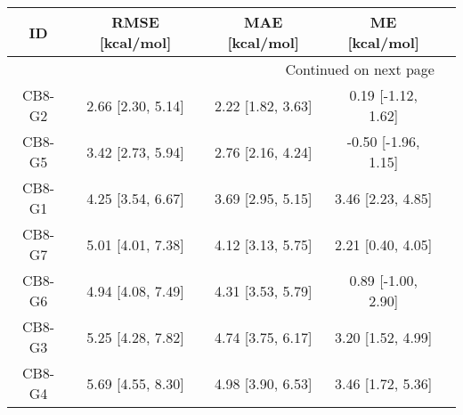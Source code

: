 \documentclass[8pt]{article}
\begin{document}
\begin{center}
\begin{footnotesize}
\begin{longtable}{|ccccc|}
\toprule
     ID &    RMSE [kcal/mol] &     MAE [kcal/mol] &        ME [kcal/mol] \\
\midrule
\endhead
\midrule
\multicolumn{4}{r}{{Continued on next page}} \\
\midrule
\endfoot

\bottomrule
\endlastfoot
 CB8-G2 &  2.66 [2.30, 5.14] &  2.22 [1.82, 3.63] &   0.19 [-1.12, 1.62] \\
 CB8-G5 &  3.42 [2.73, 5.94] &  2.76 [2.16, 4.24] &  -0.50 [-1.96, 1.15] \\
 CB8-G1 &  4.25 [3.54, 6.67] &  3.69 [2.95, 5.15] &    3.46 [2.23, 4.85] \\
 CB8-G7 &  5.01 [4.01, 7.38] &  4.12 [3.13, 5.75] &    2.21 [0.40, 4.05] \\
 CB8-G6 &  4.94 [4.08, 7.49] &  4.31 [3.53, 5.79] &   0.89 [-1.00, 2.90] \\
 CB8-G3 &  5.25 [4.28, 7.82] &  4.74 [3.75, 6.17] &    3.20 [1.52, 4.99] \\
 CB8-G4 &  5.69 [4.55, 8.30] &  4.98 [3.90, 6.53] &    3.46 [1.72, 5.36] \\
\end{longtable}
\end{footnotesize}
\end{center}
\end{document}
